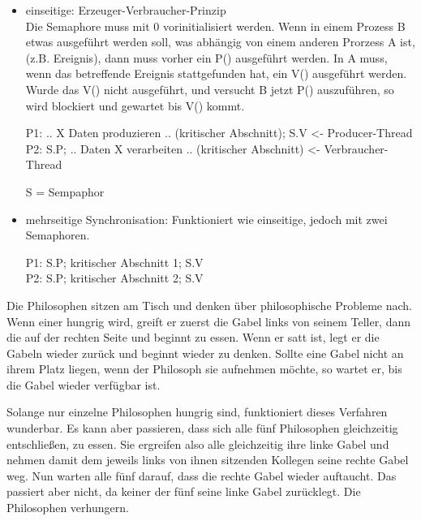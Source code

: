 \begin{answer}

\begin{itemize}

  \item einseitige: Erzeuger-Verbraucher-Prinzip \\
    Die Semaphore muss mit 0 vorinitialisiert werden. Wenn in einem Prozess B etwas ausgeführt werden soll, was abhängig von einem anderen Prorzess A ist, (z.B. Ereignis), dann muss vorher ein P() ausgeführt werden. In A muss, wenn das betreffende Ereignis stattgefunden hat, ein V() ausgeführt werden. Wurde das V() nicht ausgeführt, und versucht B jetzt P() auszuführen, so wird blockiert und gewartet bis V() kommt.

    P1: .. X Daten produzieren .. (kritischer Abschnitt); S.V <- Producer-Thread \\
    P2: S.P; .. Daten X verarbeiten .. (kritischer Abschnitt) <- Verbraucher-Thread

    S = Sempaphor

  \item mehrseitige Synchronisation: Funktioniert wie einseitige, jedoch mit zwei Semaphoren.

      P1: S.P; kritischer Abschnitt 1; S.V \\
      P2: S.P; kritischer Abschnitt 2; S.V

\end{itemize}
\end{answer}

\begin{answer}
Die Philosophen sitzen am Tisch und denken über philosophische Probleme nach. Wenn einer hungrig wird, greift er zuerst die Gabel links von seinem Teller, dann die auf der rechten Seite und beginnt zu essen. Wenn er satt ist, legt er die Gabeln wieder zurück und beginnt wieder zu denken. Sollte eine Gabel nicht an ihrem Platz liegen, wenn der Philosoph sie aufnehmen möchte, so wartet er, bis die Gabel wieder verfügbar ist.

Solange nur einzelne Philosophen hungrig sind, funktioniert dieses Verfahren wunderbar. Es kann aber passieren, dass sich alle fünf Philosophen gleichzeitig entschließen, zu essen. Sie ergreifen also alle gleichzeitig ihre linke Gabel und nehmen damit dem jeweils links von ihnen sitzenden Kollegen seine rechte Gabel weg. Nun warten alle fünf darauf, dass die rechte Gabel wieder auftaucht. Das passiert aber nicht, da keiner der fünf seine linke Gabel zurücklegt. Die Philosophen verhungern.
\end{answer}

